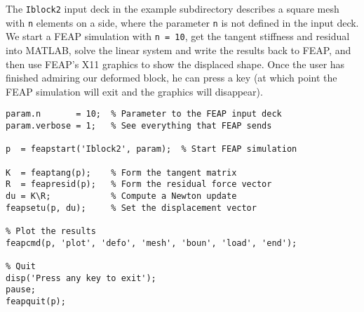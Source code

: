 The {\tt Iblock2} input deck in the example subdirectory describes a
square mesh with {\tt n} elements on a side, where the parameter {\tt n}
is not defined in the input deck.  We start a FEAP simulation with
{\tt n = 10}, get the tangent stiffness and residual into MATLAB,
solve the linear system and write the results back to FEAP, and then
use FEAP's X11 graphics to show the displaced shape.  Once the user
has finished admiring our deformed block, he can press a key (at which
point the FEAP simulation will exit and the graphics will disappear).

\begin{verbatim}
param.n       = 10;  % Parameter to the FEAP input deck
param.verbose = 1;   % See everything that FEAP sends

p  = feapstart('Iblock2', param);  % Start FEAP simulation

K  = feaptang(p);    % Form the tangent matrix
R  = feapresid(p);   % Form the residual force vector
du = K\R;            % Compute a Newton update
feapsetu(p, du);     % Set the displacement vector

% Plot the results
feapcmd(p, 'plot', 'defo', 'mesh', 'boun', 'load', 'end');

% Quit
disp('Press any key to exit');
pause;
feapquit(p);

\end{verbatim}
